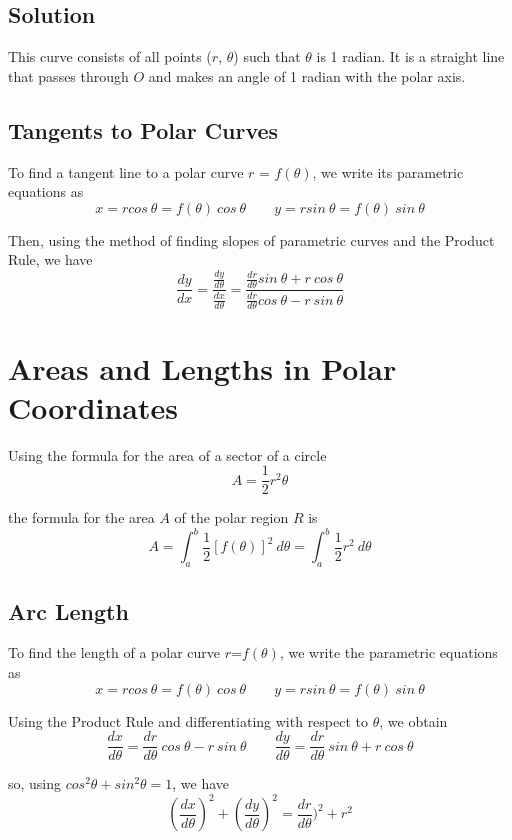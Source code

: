 \subsection*{Solution}
This curve consists of all points ($r$, $\theta$) such that $\theta$ is 1 radian.
It is a straight line that passes through $O$ and makes an angle of 1 radian with
the polar axis.

\subsection*{Tangents to Polar Curves}
To find a tangent line to a polar curve $r$ = $f(\theta)$, we write its parametric equations as
$$ x=r cos \: \theta=f(\theta)\:cos \: \theta \qquad y = r sin \: \theta = f(\theta)\:sin \: \theta$$

Then, using the method of finding slopes of parametric curves and the Product Rule, we have
$$ \frac{dy}{dx}=\frac{\frac{dy}{d\theta}}{\frac{dx}{d\theta}}=\frac{\frac{dr}{d\theta}sin\:
        \theta+r\:cos\:\theta}{\frac{dr}{d\theta}cos\:\theta-r\:sin\:\theta} $$

\section{Areas and Lengths in Polar Coordinates}

Using the formula for the area of a sector of a circle
$$ A=\frac{1}{2}r^2\theta $$

the formula for the area $A$ of the polar region $R$ is
$$ A=\int_a^b\frac{1}{2}[f(\theta)]^2 \: d\theta  = \int_a^b\frac{1}{2}r^2 \: d\theta$$

\subsection*{Arc Length}

To find the length of a polar curve $r$=$f(\theta)$, we write the parametric equations as
$$ x=r cos \: \theta=f(\theta)\:cos \: \theta \qquad y = r sin \: \theta = f(\theta)\:sin \: \theta$$

Using the Product Rule and differentiating with respect to $\theta$, we obtain
$$ \frac{dx}{d\theta}=\frac{dr}{d\theta}\:cos\:\theta-r\:sin\:\theta \qquad \frac{dy}{d\theta}=
    \frac{dr}{d\theta}\:sin\:\theta+r\:cos\:\theta $$

so, using $cos^2\theta + sin^2\theta = 1$, we have
$$ \left(\frac{dx}{d\theta}\right)^2 + \left(\frac{dy}{d\theta}\right)^2 = \frac{dr}{d\theta})^2 + r^2$$

